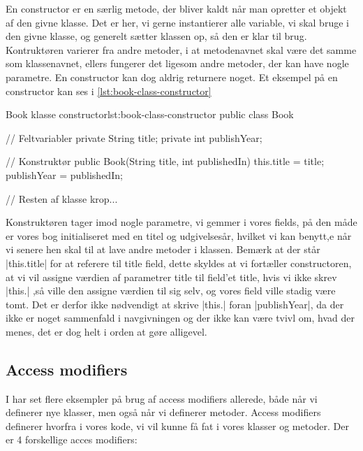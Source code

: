 En constructor er en særlig metode, der bliver kaldt når man opretter
et objekt af den givne klasse. Det er her, vi gerne instantierer alle
variable, vi skal bruge i den givne klasse, og generelt sætter klassen
op, så den er klar til brug. Kontruktøren varierer fra andre metoder,
i at metodenavnet skal være det samme som klassenavnet, ellers
fungerer det ligesom andre metoder, der kan have nogle parametre. En
constructor kan dog aldrig returnere noget. Et eksempel på en
constructor kan ses i \autoref{lst:book-class-constructor}

\begin{JavaCode}{Book klasse constructor}{lst:book-class-constructor}
	public class Book {

		// Feltvariabler
		private String title;
		private int publishYear;

		// Konstruktør
		public Book(String title, int publishedIn) {
			this.title = title;
			publishYear = publishedIn;
		}

		// Resten af klasse krop...
	}
\end{JavaCode}

Konstruktøren tager imod nogle parametre, vi gemmer i vores fields, på
den måde er vores bog initialiseret med en titel og udgivelsesår,
hvilket vi kan benytt,e når vi senere hen skal til at lave andre
metoder i klassen. Bemærk at der står \JavaInline|this.title| for at
referere til title field, dette skyldes at vi fortæller constructoren,
at vi vil assigne værdien af parametrer title til field'et title, hvis
vi ikke skrev \JavaInline|this.| ,så ville den assigne værdien til sig
selv, og vores field ville stadig være tomt. Det er derfor ikke
nødvendigt at skrive \JavaInline|this.| foran
\JavaInline|publishYear|, da der ikke er noget sammenfald i
navgivningen og der ikke kan være tvivl om, hvad der menes, det er dog
helt i orden at gøre alligevel.

\subsection{Access modifiers}

I har set flere eksempler på brug af access modifiers allerede, både
når vi definerer nye klasser, men også når vi definerer metoder.
Access modifiers definerer hvorfra i vores kode, vi vil kunne få fat i
vores klasser og metoder. Der er 4 forskellige acces modifiers:

